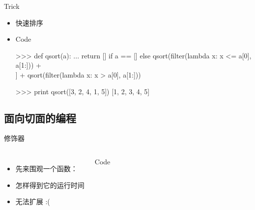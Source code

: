 \documentclass[xcolor=dvipsnames, 9pt]{beamer}
\newenvironment{code}{\begin{semiverbatim} \begin{footnotesize}}{\end{footnotesize}\end{semiverbatim}}
\begin{document}
\begin{frame}[fragile]{Trick}
	\begin{itemize}
		\item<1-> 快速排序
			\vspace{0.1cm}
		\item<2->[]\begin{exampleblock}{Code}\begin{code}
				>>> def qsort(a):
				...    return [] if a == [] else qsort(filter(lambda x: x <= a[0], a[1:])) + \\
					[a[0]] + qsort(filter(lambda x: x > a[0], a[1:]))

				>>> print qsort([3, 2, 4, 1, 5])
				[1, 2, 3, 4, 5]
			\end{code}\end{exampleblock}
	\end{itemize}
\end{frame}

\subsection{面向切面的编程}
\begin{frame}[fragile]{修饰器}
	\begin{columns}
		\begin{itemize}
			\item<1-> 先来围观一个函数：
				\vspace{0.1cm}
			\item<3-> 怎样得到它的运行时间
				\vspace{0.1cm}
			\item<5-> \alert<5>{无法扩展 :(}
		\end{itemize}
		\begin{exampleblock}{Code}\begin{code}
			
		\end{code}\end{exampleblock}
	\end{columns}
\end{frame}
\end{document}
